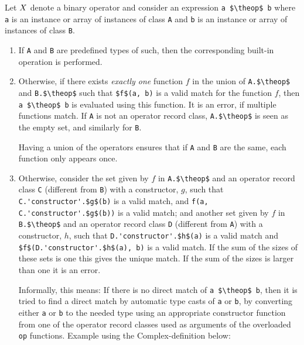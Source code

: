 Let $X$ denote a binary operator and consider an expression
\lstinline!a $\theop$ b! where \lstinline!a! is an instance or array of instances of
class \lstinline!A! and \lstinline!b! is an instance or array of instances of
class \lstinline!B!.

\begin{enumerate}
\item
  If \lstinline!A! and \lstinline!B! are predefined types of such, then the
  corresponding built-in operation is performed.
\item
  Otherwise, if there exists \emph{exactly one} function $f$ in the
  union of \lstinline!A.$\theop$! and \lstinline!B.$\theop$! such that
  \lstinline!$f$(a, b)! is a valid match for the function $f$, then
  \lstinline!a $\theop$ b! is evaluated using this function. It is an error, if
  multiple functions match. If \lstinline!A! is not an operator record class, \lstinline!A.$\theop$!
  is seen as the empty set, and similarly for \lstinline!B!.
  \begin{nonnormative}
  Having a union of the operators ensures that if \lstinline!A! and \lstinline!B! are the same, each function only appears once.
  \end{nonnormative}
\item
  Otherwise, consider the set given by $f$ in \lstinline!A.$\theop$!
  and an operator record class \lstinline!C! (different from \lstinline!B!) with a
  constructor, $g$, such that \lstinline!C.'constructor'.$g$(b)! is a valid match, and
  \lstinline!f(a, C.'constructor'.$g$(b))! is a valid match; and another set given by
  $f$ in \lstinline!B.$\theop$! and an operator record class \lstinline!D!
  (different from \lstinline!A!) with a constructor, $h$, such that
  \lstinline!D.'constructor'.$h$(a)! is a valid match and \lstinline!$f$(D.'constructor'.$h$(a), b)!
  is a valid match. If the sum of the sizes of these sets is one this
  gives the unique match. If the sum of the sizes is larger than one it
  is an error.
\begin{nonnormative}
  Informally, this means: If there is no direct match of \lstinline!a $\theop$ b!, then it is tried to find a direct match by automatic type casts
  of \lstinline!a! or \lstinline!b!, by converting either \lstinline!a! or \lstinline!b! to the needed
  type using an appropriate constructor function from one of the
  operator record classes used as arguments of the overloaded \lstinline!op!
  functions. Example using the Complex-definition below:
\begin{lstlisting}[language=modelica]

\end{lstlisting}
\end{nonnormative}
\end{enumerate}
